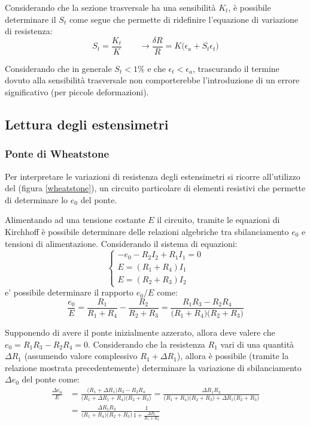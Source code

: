 		Considerando che la sezione trasversale ha una sensibilità $K_t$, è possibile determinare il  $S_t$ come segue che permette di ridefinire l'equazione di variazione di resistenza:
		\[ S_t = \frac{K_t}{K} \qquad \rightarrow \frac {\delta R} R = K\big(\epsilon_a+ S_t\epsilon_t\big)  \]
		
		Considerando che in generale $S_t < 1\%$ e che $\epsilon_t<\epsilon_a$, trascurando il termine dovuto alla sensibilità trasversale non comporterebbe l'introduzione di un errore significativo (per piccole deformazioni).
		
	\subsection{Lettura degli estensimetri}
	\subsubsection{Ponte di Wheatstone}
		Per interpretare le variazioni di resistenza degli estensimetri si ricorre all'utilizzo del  (figura \ref{wheatstone}), un circuito particolare di elementi resistivi che permette di determinare lo  $e_0$ del ponte.
		
		
		Alimentando ad una tensione costante $E$ il circuito, tramite le equazioni di Kirchhoff è possibile determinare delle relazioni algebriche tra sbilanciamento $e_0$ e tensioni di alimentazione. Considerando il sistema di equazioni:
		\[ \begin{cases}
			-e_0 - R_2I_2 +R_1I_1 = 0 \\ E = (R_1+R_4) I_1 \\ E = (R_2+R_3)I_2
		\end{cases}\]
		e' possibile determinare il rapporto $e_0/E$ come:
		\[ \frac{e_0}{E} = \frac{R_1}{R_1+R_4} - \frac{R_2}{R_2+R_3} = \frac{R_1R_3-R_2R_4}{\big(R_1+R_4\big) \big(R_2+R_3\big)} \]
		
		Supponendo di avere il ponte inizialmente azzerato, allora deve valere che $e_0 = R_1R_3-R_2R_4=0$. Considerando che la resistenza $R_1$ vari di una quantità $\Delta R_1$ (assumendo valore complessivo $R_1+\Delta R_1$), allora è possibile (tramite la relazione mostrata precedentemente) determinare la variazione di sbilanciamento $\Delta e_0$ del ponte come:
		\begin{align*}
			\frac{\Delta e_0}{E} & = \frac{\big(R_1+\Delta R_1\big)R_3-R_2R_4} {\big(R_1+\Delta R_1+R_4\big)\big(R_2+R_3\big)} = \frac{\Delta R_1 R_3}{\big(R_1+R_4\big) \big(R_2+R_3\big) + \Delta R_1 \big(R_2+R_3\big)} \\
			 &= \frac{\Delta R_1 R_3}{\big(R_1+R_4\big) \big(R_2+R_3\big) } \frac{1}{1+\frac{\Delta R_1}{R_1+R_4}}
		\end{align*}
		
